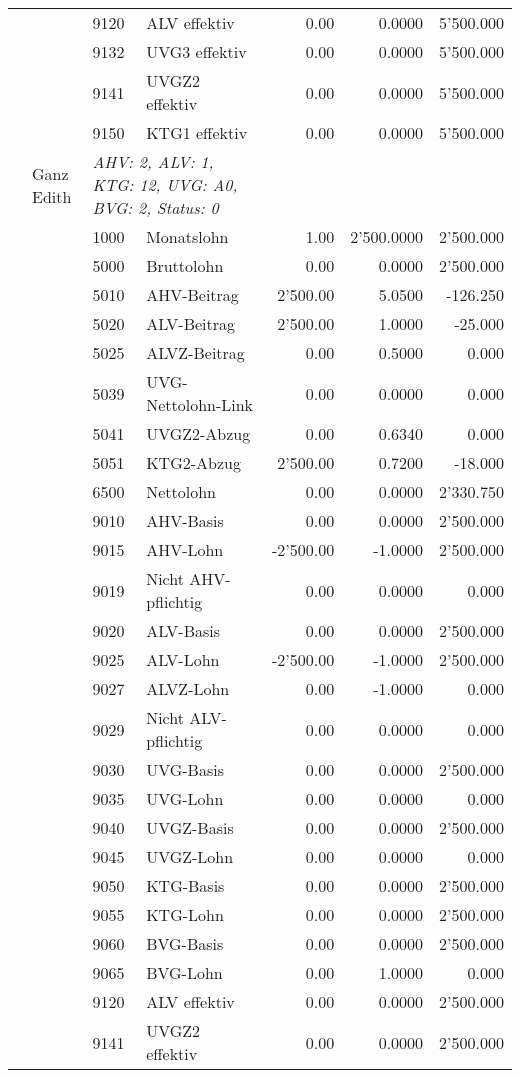 \documentclass[15pt,a4paper]{article}
\begin{document}
\begin{longtable}{@{\extracolsep{\fill}}l l l l|r|r|r}
&&9120&ALV effektiv&0.00&0.0000&5'500.000\\
&&9132&UVG3 effektiv&0.00&0.0000&5'500.000\\
&&9141&UVGZ2 effektiv&0.00&0.0000&5'500.000\\
&&9150&KTG1 effektiv&0.00&0.0000&5'500.000\\
\pagebreak
21&Ganz Edith&\multicolumn{2}{l|}{\small\emph{AHV: 2, ALV: 1, KTG: 12, UVG: A0, BVG: 2, Status: 0}}&& \\
&&1000&Monatslohn&1.00&2'500.0000&2'500.000\\
&&5000&Bruttolohn&0.00&0.0000&2'500.000\\
&&5010&AHV-Beitrag&2'500.00&5.0500&-126.250\\
&&5020&ALV-Beitrag&2'500.00&1.0000&-25.000\\
&&5025&ALVZ-Beitrag&0.00&0.5000&0.000\\
&&5039&UVG-Nettolohn-Link&0.00&0.0000&0.000\\
&&5041&UVGZ2-Abzug&0.00&0.6340&0.000\\
&&5051&KTG2-Abzug&2'500.00&0.7200&-18.000\\
&&6500&Nettolohn&0.00&0.0000&2'330.750\\
&&9010&AHV-Basis&0.00&0.0000&2'500.000\\
&&9015&AHV-Lohn&-2'500.00&-1.0000&2'500.000\\
&&9019&Nicht AHV-pflichtig&0.00&0.0000&0.000\\
&&9020&ALV-Basis&0.00&0.0000&2'500.000\\
&&9025&ALV-Lohn&-2'500.00&-1.0000&2'500.000\\
&&9027&ALVZ-Lohn&0.00&-1.0000&0.000\\
&&9029&Nicht ALV-pflichtig&0.00&0.0000&0.000\\
&&9030&UVG-Basis&0.00&0.0000&2'500.000\\
&&9035&UVG-Lohn&0.00&0.0000&0.000\\
&&9040&UVGZ-Basis&0.00&0.0000&2'500.000\\
&&9045&UVGZ-Lohn&0.00&0.0000&0.000\\
&&9050&KTG-Basis&0.00&0.0000&2'500.000\\
&&9055&KTG-Lohn&0.00&0.0000&2'500.000\\
&&9060&BVG-Basis&0.00&0.0000&2'500.000\\
&&9065&BVG-Lohn&0.00&1.0000&0.000\\
&&9120&ALV effektiv&0.00&0.0000&2'500.000\\
&&9141&UVGZ2 effektiv&0.00&0.0000&2'500.000\\

\end{longtable}
\end{document}
